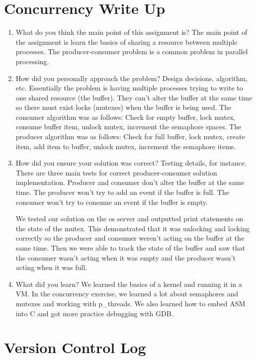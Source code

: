 \documentclass[letterpaper,10pt,draftclsnofoot,onecolumn,titlepage]{IEEEtran}
\begin{document}
\section{Concurrency Write Up}
\begin{enumerate}  
		\item What do you think the main point of this assignment is?
		   The main point of the assignment is learn the basics of sharing a resource between multiple processes. The producer-consumer problem is a common problem in parallel processing.
		\item How did you personally approach the problem? Design decisions, algorithm, etc.
		   Essentially the problem is having multiple processes trying to write to one shared resource (the buffer). They can't alter the buffer at the same time so there must exist locks (mutexes) when the buffer is being used.
		   The consumer algorithm was as follows: Check for empty buffer, lock mutex, consume buffer item, unlock mutex, increment the semaphore spaces.
		   The producer algorithm was as follows: Check for full buffer, lock mutex, create item, add item to buffer, unlock mutex, increment the semaphore items. 
		\item How did you ensure your solution was correct? Testing details, for instance.
		   There are three main tests for correct producer-consumer solution implementation.
		   Producer and consumer don't alter the buffer at the same time.
		   The producer won't try to add an event if the buffer is full.
		   The consumer won't try to consume an event if the buffer is empty.

		   We tested our solution on the os server and outputted print statements on the state of the mutex. This demonstrated that it was unlocking and locking correctly so the producer and consumer weren't acting on the buffer at the same time. Then we were able to track the state of the buffer and saw that the consumer wasn't acting when it was empty and the producer wasn't acting when it was full.
		\item What did you learn?
		   We learned the basics of a kernel and running it in a VM. In the concurrency exercise, we learned a lot about semaphores and mutexes and working with p\_threads. We also learned how to embed ASM into C and got more practice debugging with GDB.
 	\end{enumerate}
    
\section{Version Control Log}

\end{document}
